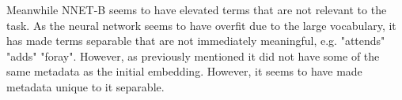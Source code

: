 Meanwhile NNET-B seems to have elevated terms that are not relevant to the task. As the neural network seems to have overfit due to the large vocabulary, it has made terms separable that are not immediately meaningful, e.g. "attends" "adds" "foray". However, as previously mentioned it did  not have some of the same metadata as the initial embedding. However, it seems to have made metadata unique to it separable. 


